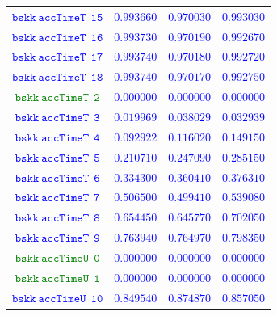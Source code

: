 \documentclass[10pt,a4paper]{article}
\begin{document}
\begin{table}[h!]
{\begin{tabular}{cccc}
\textcolor{blue}{$\mathtt{bskk~accTimeT~~15}$} & \textcolor{blue}{$0.993660$}& \textcolor{blue}{$0.970030$}& \textcolor{blue}{$0.993030$}\\
\textcolor{blue}{$\mathtt{bskk~accTimeT~~16}$} & \textcolor{blue}{$0.993730$}& \textcolor{blue}{$0.970190$}& \textcolor{blue}{$0.992670$}\\
\textcolor{blue}{$\mathtt{bskk~accTimeT~~17}$} & \textcolor{blue}{$0.993740$}& \textcolor{blue}{$0.970180$}& \textcolor{blue}{$0.992720$}\\
\textcolor{blue}{$\mathtt{bskk~accTimeT~~18}$} & \textcolor{blue}{$0.993740$}& \textcolor{blue}{$0.970170$}& \textcolor{blue}{$0.992750$}\\
\textcolor{Green}{$\mathtt{bskk~accTimeT~~2}$} & \textcolor{blue}{$0.000000$}& \textcolor{blue}{$0.000000$}& \textcolor{blue}{$0.000000$}\\
\textcolor{blue}{$\mathtt{bskk~accTimeT~~3}$} & \textcolor{blue}{$0.019969$}& \textcolor{blue}{$0.038029$}& \textcolor{blue}{$0.032939$}\\
\textcolor{blue}{$\mathtt{bskk~accTimeT~~4}$} & \textcolor{blue}{$0.092922$}& \textcolor{blue}{$0.116020$}& \textcolor{blue}{$0.149150$}\\
\textcolor{blue}{$\mathtt{bskk~accTimeT~~5}$} & \textcolor{blue}{$0.210710$}& \textcolor{blue}{$0.247090$}& \textcolor{blue}{$0.285150$}\\
\textcolor{blue}{$\mathtt{bskk~accTimeT~~6}$} & \textcolor{blue}{$0.334300$}& \textcolor{blue}{$0.360410$}& \textcolor{blue}{$0.376310$}\\
\textcolor{blue}{$\mathtt{bskk~accTimeT~~7}$} & \textcolor{blue}{$0.506500$}& \textcolor{blue}{$0.499410$}& \textcolor{blue}{$0.539080$}\\
\textcolor{blue}{$\mathtt{bskk~accTimeT~~8}$} & \textcolor{blue}{$0.654450$}& \textcolor{blue}{$0.645770$}& \textcolor{blue}{$0.702050$}\\
\textcolor{blue}{$\mathtt{bskk~accTimeT~~9}$} & \textcolor{blue}{$0.763940$}& \textcolor{blue}{$0.764970$}& \textcolor{blue}{$0.798350$}\\
\textcolor{Green}{$\mathtt{bskk~accTimeU~~0}$} & \textcolor{blue}{$0.000000$}& \textcolor{blue}{$0.000000$}& \textcolor{blue}{$0.000000$}\\
\textcolor{Green}{$\mathtt{bskk~accTimeU~~1}$} & \textcolor{blue}{$0.000000$}& \textcolor{blue}{$0.000000$}& \textcolor{blue}{$0.000000$}\\
\textcolor{blue}{$\mathtt{bskk~accTimeU~~10}$} & \textcolor{blue}{$0.849540$}& \textcolor{blue}{$0.874870$}& \textcolor{blue}{$0.857050$}\\

\end{tabular}}
\end{table}
\end{document}
